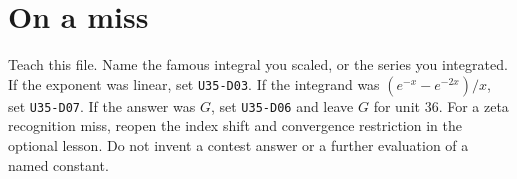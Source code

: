 \section*{On a miss}
Teach this file. Name the famous integral you scaled, or the series you integrated. If the exponent was linear, set \texttt{U35-D03}. If the integrand was $(e^{-x}-e^{-2x})/x$, set \texttt{U35-D07}. If the answer was $G$, set \texttt{U35-D06} and leave $G$ for unit 36. For a zeta recognition miss, reopen the index shift and convergence restriction in the optional lesson. Do not invent a contest answer or a further evaluation of a named constant.

